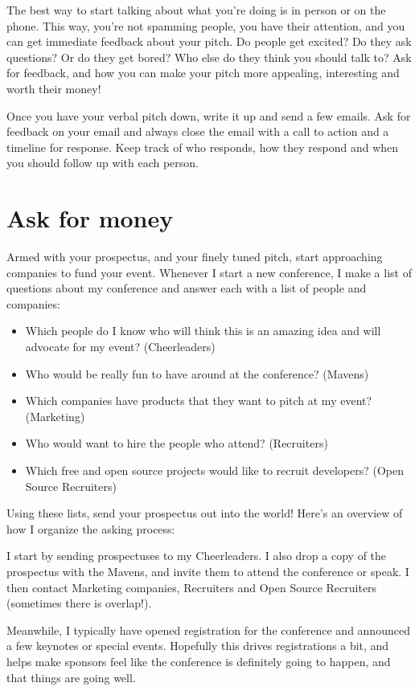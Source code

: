 The best way to start talking about what you’re doing is in person or on the phone. This way, you’re not spamming people, you have their attention, and you can get immediate feedback about your pitch. Do people get excited? Do they ask questions? Or do they get bored? Who else do they think you should talk to? Ask for feedback, and how you can make your pitch more appealing, interesting and worth their money!

Once you have your verbal pitch down, write it up and send a few emails. Ask for feedback on your email and always close the email with a call to action and a timeline for response.  Keep track of who responds, how they respond and when you should follow up with each person.

\section*{Ask for money}
Armed with your prospectus, and your finely tuned pitch, start approaching companies to fund your event. Whenever I start a new conference, I make a list of questions about my conference and answer each with a list of people and companies: 

\begin{itemize}
\item Which people do I know who will think this is an amazing idea and will advocate for my event? (Cheerleaders)
\item Who would be really fun to have around at the conference? (Mavens)
\item Which companies have products that they want to pitch at my event? (Marketing)
\item Who would want to hire the people who attend? (Recruiters)
\item Which free and open source projects would like to recruit developers? (Open Source Recruiters)
\end{itemize}

Using these lists, send your prospectus out into the world! Here’s an overview of how I organize the asking process: 

I start by sending prospectuses to my Cheerleaders. I also drop a copy of the prospectus with the Mavens, and invite them to attend the conference or speak. I then contact Marketing companies, Recruiters and Open Source Recruiters (sometimes there is overlap!).

Meanwhile, I typically have opened registration for the conference and announced a few keynotes or special events. Hopefully this drives registrations a bit, and helps make sponsors feel like the conference is definitely going to happen, and that things are going well.

